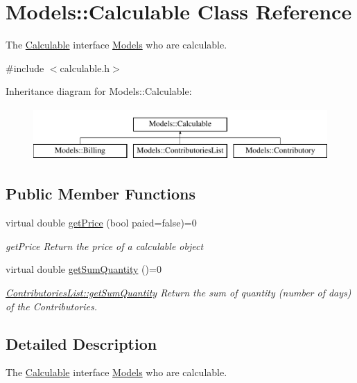 \hypertarget{classModels_1_1Calculable}{\section{Models\-:\-:Calculable Class Reference}
\label{classModels_1_1Calculable}
}


The \hyperlink{classModels_1_1Calculable}{Calculable} interface \hyperlink{namespaceModels}{Models} who are calculable.  




{\ttfamily \#include $<$calculable.\-h$>$}

Inheritance diagram for Models\-:\-:Calculable\-:\begin{figure}[H]
\begin{center}
\leavevmode
\includegraphics[height=2.000000cm]{dc/d99/classModels_1_1Calculable}
\end{center}
\end{figure}
\subsection*{Public Member Functions}
\begin{DoxyCompactItemize}
\item 
virtual double \hyperlink{classModels_1_1Calculable_a5267ee09fc9284063a9fc874b4cc68dc}{get\-Price} (bool paied=false)=0
\begin{DoxyCompactList}\small\item\em get\-Price Return the price of a calculable object \end{DoxyCompactList}\item 
virtual double \hyperlink{classModels_1_1Calculable_a4f9d590b39bd1f0d9e026ac86f1fada1}{get\-Sum\-Quantity} ()=0
\begin{DoxyCompactList}\small\item\em \hyperlink{classModels_1_1ContributoriesList_af9b3b1b703cebeef552d058999ffcc4c}{Contributories\-List\-::get\-Sum\-Quantity} Return the sum of quantity (number of days) of the Contributories. \end{DoxyCompactList}\end{DoxyCompactItemize}


\subsection{Detailed Description}
The \hyperlink{classModels_1_1Calculable}{Calculable} interface \hyperlink{namespaceModels}{Models} who are calculable. 

